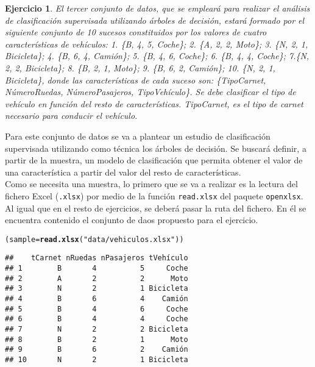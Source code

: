 \documentclass[12pt]{report}\usepackage[]{graphicx}\usepackage[dvipsnames]{xcolor}
\makeatletter
\newcommand{\hlstr}[1]{\textcolor[rgb]{0.192,0.494,0.8}{#1}}%
\newcommand{\hlstd}[1]{\textcolor[rgb]{0.345,0.345,0.345}{#1}}%
\newcommand{\hlkwb}[1]{\textcolor[rgb]{0.69,0.353,0.396}{#1}}%
\newcommand{\hlkwd}[1]{\textcolor[rgb]{0.737,0.353,0.396}{\textbf{#1}}}%
\newenvironment{kframe}{%
 \def\at@end@of@kframe{}%
 \ifinner\ifhmode%
  \def\at@end@of@kframe{\end{minipage}}%
  \begin{minipage}{\columnwidth}%
 \fi\fi%
 \def\FrameCommand##1{\hskip\@totalleftmargin \hskip-\fboxsep
 \colorbox{shadecolor}{##1}\hskip-\fboxsep
     \hskip-\linewidth \hskip-\@totalleftmargin \hskip\columnwidth}%
 \MakeFramed {\advance\hsize-\width
   \@totalleftmargin\z@ \linewidth\hsize
   \@setminipage}}%
 {\par\unskip\endMakeFramed%
 \at@end@of@kframe}
\newenvironment{knitrout}{}{} %
\newtheorem{exercise}{Ejercicio}[section]
\makeatother
\begin{document}
 				\begin{exercise}
 					El tercer conjunto de datos, que se empleará para realizar el análisis de clasificación supervisada utilizando árboles de decisión, estará formado por el siguiente conjunto de 10 sucesos constituidos por los valores de cuatro características de vehículos: 1. \{B, 4, 5, Coche\}; 2. \{A, 2, 2, Moto\}; 3. \{N, 2, 1, Bicicleta\}; 4. \{B, 6, 4, Camión\};
 					5. \{B, 4, 6, Coche\}; 6. \{B, 4, 4, Coche\}; 7.\{N, 2, 2, Bicicleta\}; 8. \{B, 2, 1, Moto\}; 9. \{B, 6, 2, Camión\}; 10. \{N, 2, 1, Bicicleta\}, donde las características de cada suceso son: \{TipoCarnet, NúmeroRuedas, NúmeroPasajeros, TipoVehículo\}. Se debe clasificar el tipo de vehículo en función del resto de características. TipoCarnet, es el
 					tipo de carnet necesario para conducir el vehículo.
 				\end{exercise}
 				
 				Para este conjunto de datos se va a plantear un estudio de clasificación supervisada utilizando como técnica los árboles de decisión. Se buscará definir, a partir de la muestra, un modelo de clasificación que permita obtener el valor de una característica a partir del valor del resto de características. \\
 				
 				Como se necesita una muestra, lo primero que se va a realizar es la lectura del fichero Excel (\texttt{.xlsx}) por medio de la función \texttt{read.xlsx} del paquete \texttt{openxlsx}. Al igual que en el resto de ejercicios, se deberá pasar la ruta del fichero. En él se encuentra contenido el conjunto de daos propuesto para el ejercicio.
 				
\begin{knitrout}
\color{fgcolor}\begin{kframe}
\begin{alltt}
\hlstd{(sample} \hlkwb{=} \hlkwd{read.xlsx}\hlstd{(}\hlstr{"data/vehiculos.xlsx"}\hlstd{))}
\end{alltt}
\begin{verbatim}
##    tCarnet nRuedas nPasajeros tVehículo
## 1        B       4          5     Coche
## 2        A       2          2      Moto
## 3        N       2          1 Bicicleta
## 4        B       6          4    Camión
## 5        B       4          6     Coche
## 6        B       4          4     Coche
## 7        N       2          2 Bicicleta
## 8        B       2          1      Moto
## 9        B       6          2    Camión
## 10       N       2          1 Bicicleta
\end{verbatim}
\end{kframe}
\end{knitrout}
 				
\end{document}
